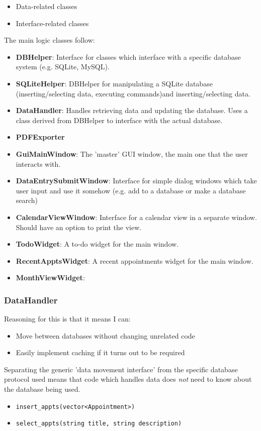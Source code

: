 \begin{itemize}
    \item Data-related classes
    \item Interface-related classes
\end{itemize}

\newcommand{\classitem}[1]{\item \textbf{#1}}

The main logic classes follow:

\begin{itemize}
    \classitem{DBHelper}: Interface for classes which interface with a specific
    database system (e.g. SQLite, MySQL).
    \classitem{SQLiteHelper}: DBHelper for manipulating a SQLite database
    (inserting/selecting data, executing commands)and inserting/selecting data.
    \classitem{DataHandler}: Handles retrieving data and updating the database.
    Uses a class derived from DBHelper to interface with the actual database.
    \classitem{PDFExporter}
\end{itemize}


\begin{itemize}
    \classitem{GuiMainWindow}: The 'master' GUI window, the main one that the
        user interacts with.
    \classitem{DataEntrySubmitWindow}: Interface for simple dialog windows
        which take user input and use it somehow (e.g. add to a database or make
        a database search)
    \classitem{CalendarViewWindow}: Interface for a calendar view in a separate
        window. Should have an option to print the view.
    \classitem{TodoWidget}: A to-do widget for the main window.
    \classitem{RecentApptsWidget}: A recent appointments widget for the main
    window.
    \classitem{MonthViewWidget}:
\end{itemize}


\subsubsection{DataHandler}

Reasoning for this is that it means I can:

\begin{itemize}
    \item Move between databases without changing unrelated code
    \item Easily implement caching if it turns out to be required
\end{itemize}

Separating the generic 'data movement interface' from the specific database
protocol used means that code which handles data does \textit{not} need to know
about the database being used.

\begin{itemize}
    \item \verb+insert_appts(vector<Appointment>)+
    \item \verb+select_appts(string title, string description)+
\end{itemize}
